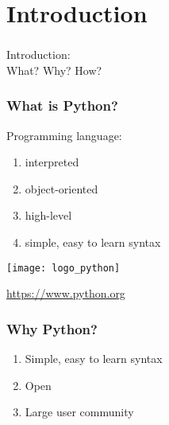 \section{Introduction}


\begin{frame}
\frametitle{}
\huge Introduction:\\
What? Why? How?
\end{frame}

\begin{frame}
\frametitle{What is Python?}

Programming language:
\begin{enumerate}
\item interpreted 
\item object-oriented 
\item high-level 
\item simple, easy to learn syntax
\end{enumerate}

\vfill

\texttt{[image: logo\_python]}


\url{https://www.python.org}

\end{frame}



\begin{frame}
\frametitle{Why Python?}

\begin{enumerate}
\item Simple, easy to learn syntax
\item Open
\item Large user community 
\end{enumerate}

\end{frame}


